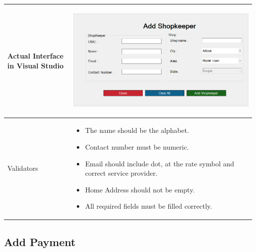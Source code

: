 \documentclass[12pt,a4paper]{article}
\begin{document}
\begin{longtable}{| p{3cm}|p{12cm}|}
Actual Interface in Visual Studio  & \begin{center} \includegraphics[scale=0.3]{./User Interface1/UI-019 Add ShopAndShopKeeper@1x.png}\end{center}  \\ \hline

Validators & 
\begin{itemize}
\item  The name should be the alphabet.
\item  Contact number must be numeric. 
\item  Email should include dot, at the rate symbol and correct service provider.
\item Home Address should not be empty. 
 
\item All required fields must be filled correctly. 
\end{itemize}
\\ \hline

\end{longtable}
\subsection{Add Payment }
\end{document}

